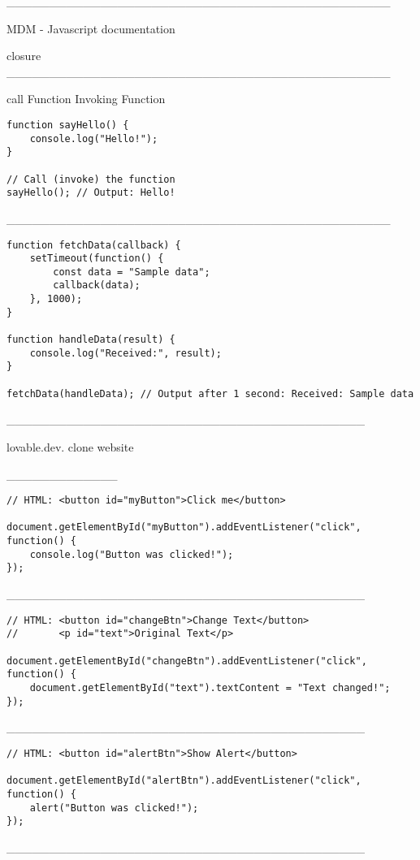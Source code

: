 _____________________________________________

MDM - Javascript
documentation 

closure
_____________________________________________


call Function
Invoking Function 


\begin{verbatim}
function sayHello() {
    console.log("Hello!");
}

// Call (invoke) the function
sayHello(); // Output: Hello!
\end{verbatim}


_____________________________________________



\begin{verbatim}
function fetchData(callback) {
    setTimeout(function() {
        const data = "Sample data";
        callback(data);
    }, 1000);
}

function handleData(result) {
    console.log("Received:", result);
}

fetchData(handleData); // Output after 1 second: Received: Sample data
\end{verbatim}



__________________________________________


lovable.dev. clone website


_____________


\begin{verbatim}
// HTML: <button id="myButton">Click me</button>

document.getElementById("myButton").addEventListener("click", function() {
    console.log("Button was clicked!");
});
\end{verbatim}

__________________________________________

\begin{verbatim}
// HTML: <button id="changeBtn">Change Text</button>
//       <p id="text">Original Text</p>

document.getElementById("changeBtn").addEventListener("click", function() {
    document.getElementById("text").textContent = "Text changed!";
});
\end{verbatim}
__________________________________________


\begin{verbatim}
// HTML: <button id="alertBtn">Show Alert</button>

document.getElementById("alertBtn").addEventListener("click", function() {
    alert("Button was clicked!");
});
\end{verbatim}

__________________________________________
